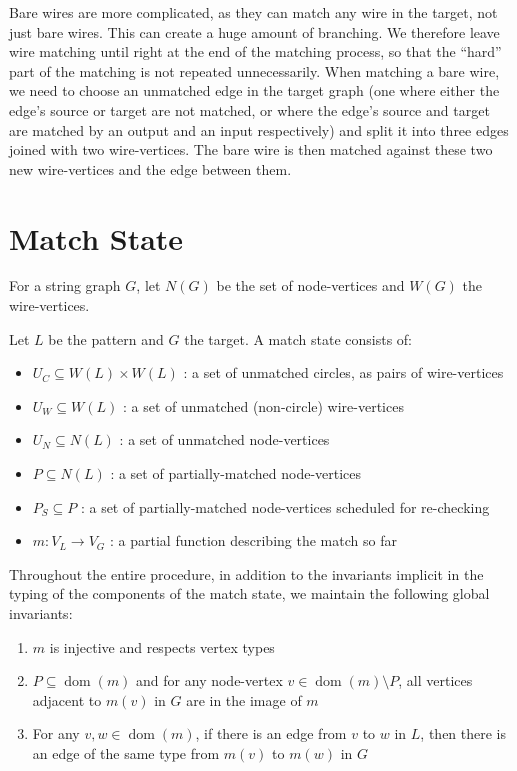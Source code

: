 \documentclass{article}
\DeclareMathOperator{\dom}{dom}
\begin{document}
Bare wires are more complicated, as they can match any wire in the target, not just bare wires.  This can create a huge amount of branching.  We therefore leave wire matching until right at the end of the matching process, so that the ``hard'' part of the matching is not repeated unnecessarily.  When matching a bare wire, we need to choose an unmatched edge in the target graph (one where either the edge's source or target are not matched, or where the edge's source and target are matched by an output and an input respectively) and split it into three edges joined with two wire-vertices.  The bare wire is then matched against these two new wire-vertices and the edge between them.


\section{Match State}
\label{sec:match-state}

For a string graph $G$, let $N(G)$ be the set of node-vertices and $W(G)$ the wire-vertices.

Let $L$ be the pattern and $G$ the target. A match state consists of:

\begin{itemize}
    \item $U_C \subseteq W(L)\times W(L)$ : a set of unmatched circles, as pairs of wire-vertices
    \item $U_W \subseteq W(L)$ : a set of unmatched (non-circle) wire-vertices
    \item $U_N \subseteq N(L)$ : a set of unmatched node-vertices
    \item $P \subseteq N(L)$ : a set of partially-matched node-vertices
    \item $P_S \subseteq P$ : a set of partially-matched node-vertices scheduled for re-checking
    \item $m : V_L \rightarrow V_G$ : a partial function describing the match so far
\end{itemize}

Throughout the entire procedure, in addition to the invariants implicit in the typing of the components of the match state, we maintain the following global invariants:
\begin{enumerate}
  \renewcommand{\theenumi}{(\arabic{enumi})}
  \renewcommand{\labelenumi}{\theenumi}
  \item \label{enum:g-inv-inj} $m$ is injective and respects vertex types
  \item \label{enum:g-inv-local-iso} $P \subseteq \dom(m)$ and for any node-vertex $v \in \dom(m)\setminus P$, all vertices adjacent to $m(v)$ in $G$ are in the image of $m$
  \item \label{enum:g-inv-edge-match} For any $v,w \in \dom(m)$, if there is an edge from $v$ to $w$ in $L$, then there is an edge of the same type from $m(v)$ to $m(w)$ in $G$
\end{enumerate}
\end{document}
